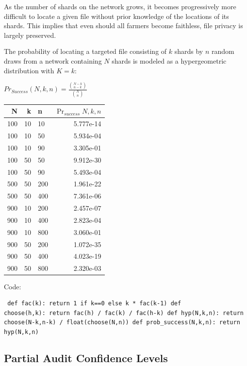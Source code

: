 \documentclass[a4paper,10pt]{article} \usepackage[utf8]{inputenc}
\begin{document}
As the number of shards on the network grows, it becomes progressively more
difficult to locate a given file without prior knowledge of the locations of its
shards. This implies that even should all farmers become faithless, file privacy
is largely preserved.

The probability of locating a targeted file consisting of $ k $ shards by $ n $
random draws from a network containing $ N $ shards is modeled as a
hypergeometric distribution with $ K = k $:

{\centering $Pr_{Success}(N,k,n) = \displaystyle \frac{{N-k \choose n-k}}{{N
\choose n}}$ \\}

\begin{table}[hbt!] \begin{center} \begin{tabular}{r r l r} N & k & n &
$\Pr_{success}{N,k,n}$\\ \hline 100 & 10 & 10  & 5.777e-14\\ \hline 100 & 10 &
50  & 5.934e-04\\ \hline 100 & 10 & 90  & 3.305e-01\\ \hline 100 & 50 & 50  &
9.912e-30\\ \hline 100 & 50 & 90  & 5.493e-04\\ \hline 500 & 50 & 200 &
1.961e-22\\ \hline 500 & 50 & 400 & 7.361e-06\\ \hline 900 & 10 & 200 &
2.457e-07\\ \hline 900 & 10 & 400 & 2.823e-04\\ \hline 900 & 10 & 800 &
3.060e-01\\ \hline 900 & 50 & 200 & 1.072e-35\\ \hline 900 & 50 & 400 &
4.023e-19\\ \hline 900 & 50 & 800 & 2.320e-03\\ \end{tabular} \end{center}
\end{table}

Code: \begin{lstlisting} def fac(k): return 1 if k==0 else k * fac(k-1) def
choose(h,k): return fac(h) / fac(k) / fac(h-k) def hyp(N,k,n): return
choose(N-k,n-k) / float(choose(N,n)) def prob_success(N,k,n): return hyp(N,k,n)
\end{lstlisting}

\subsection{Partial Audit Confidence Levels}
\end{document}
